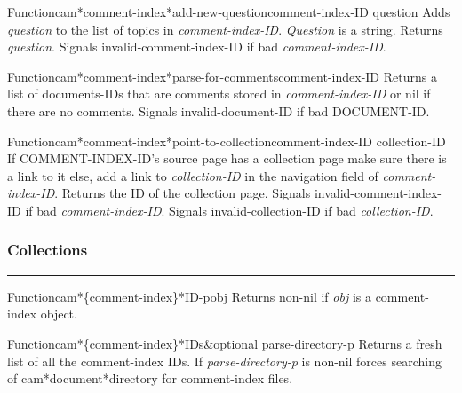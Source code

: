 \begin{functiondoc}{Function}{cam*comment-index*add-new-question}{comment-index-ID question}
Adds {\em question} to the list of topics in {\em comment-index-ID}.
{\em Question} is a string.
Returns {\em question}.
Signals invalid-comment-index-ID if bad {\em comment-index-ID}.
\end{functiondoc}

\begin{functiondoc}{Function}{cam*comment-index*parse-for-comments}{comment-index-ID}
Returns a list of documents-IDs that are comments stored in {\em comment-index-ID}
or nil if there are no comments.
Signals invalid-document-ID if bad DOCUMENT-ID.
\end{functiondoc}

\begin{functiondoc}{Function}{cam*comment-index*point-to-collection}{comment-index-ID collection-ID}
If COMMENT-INDEX-ID's source page has a collection page make sure there is 
a link to it else, add a link to {\em collection-ID} in the navigation field of 
{\em comment-index-ID}.
Returns the ID of the collection page.
Signals invalid-comment-index-ID if bad {\em comment-index-ID}.
Signals invalid-collection-ID if bad {\em collection-ID}.
\end{functiondoc}


\subsubsection*{Collections}
\par\vspace*{0.00in}\par\hrule\par\medskip\par


\begin{functiondoc}{Function}{cam*\{comment-index\}*ID-p}{obj}
Returns non-nil if {\em obj} is a comment-index object.
\end{functiondoc}

\begin{functiondoc}{Function}{cam*\{comment-index\}*IDs}{\&optional parse-directory-p}
Returns a fresh list of all the comment-index IDs.
If {\em parse-directory-p} is non-nil forces searching of cam*document*directory for 
comment-index files.
\end{functiondoc}


